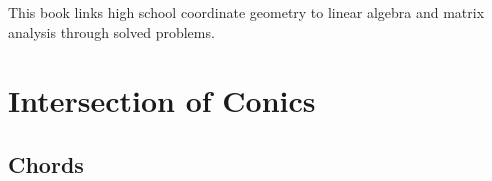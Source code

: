 \documentclass[11pt]{book}
\begin{document}

\setcounter{page}{1}

\begin{introduction}
This book links high school coordinate geometry to linear algebra and matrix analysis through solved problems.
\end{introduction}

\mainmatter
\chapter{Intersection of Conics}
\section{Chords}

%
\end{document}
